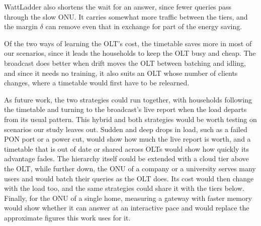 \documentclass[cic,dipl,english]{infufrgs}
\begin{document}
WattLadder also shortens the wait for an answer, since fewer queries pass through the slow ONU.
It carries somewhat more traffic between the tiers, and the margin $\delta$ can remove even
that in exchange for part of the energy saving.

Of the two ways of learning the OLT's cost, the timetable saves more in most of our scenarios,
since it leads the households to keep the OLT busy and cheap. The broadcast does better when
drift moves the OLT between batching and idling, and since it needs no training, it also suits
an OLT whose number of clients changes, where a timetable would first have to be relearned.

As future work, the two strategies could run together, with households following the timetable
and turning to the broadcast's live report when the load departs from its usual pattern. This
hybrid and both strategies would be worth testing on scenarios our study leaves out. Sudden and
deep drops in load, such as a failed PON port or a power cut, would show how much the live report
is worth, and a timetable that is out of date or shared across OLTs would show how quickly its
advantage fades. The hierarchy itself could be extended with a cloud tier above the OLT, while
further down, the ONU of a company or a university serves many users and would batch their
queries as the OLT does. Its cost would then change with the load too, and the same strategies
could share it with the tiers below. Finally, for the ONU of a single home, measuring a gateway
with faster memory would show whether it can answer at an interactive pace and would replace
the approximate figures this work uses for it.



\end{document}
